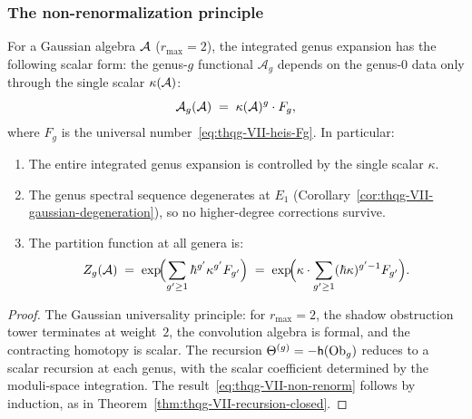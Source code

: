 \subsubsection{The non-renormalization principle}
\label{subsubsec:thqg-VII-non-renormalization}

\begin{theorem}
\label{thm:thqg-VII-non-renormalization}
For a Gaussian algebra $\mathcal{A}$ \textup{(}$r_{\max} = 2$\textup{)},
the integrated genus expansion has the following scalar
form: the genus-$g$ functional
$\mathcal{A}_g$ depends on the genus-$0$ data only through
the single scalar $\kappa(\mathcal{A})$:
\begin{equation}\label{eq:thqg-VII-non-renorm}
\mathcal{A}_g(\mathcal{A})
\;=\;
\kappa(\mathcal{A})^g \cdot F_g,
\end{equation}
where $F_g$ is the universal number~\eqref{eq:thqg-VII-heis-Fg}.
In particular:
\begin{enumerate}[label=\textup{(\roman*)}]
\item The entire integrated genus expansion is controlled by the
 single scalar $\kappa$.
\item The genus spectral sequence degenerates at $E_1$
 \textup{(}Corollary~\textup{\ref{cor:thqg-VII-gaussian-degeneration})},
 so no higher-degree corrections survive.
\item The partition function at all genera is:
 \begin{equation}\label{eq:thqg-VII-non-renorm-Z}
 Z_g(\mathcal{A})
 \;=\;
 \exp\!\Bigl(\sum_{g' \geq 1} \hbar^{g'}
 \kappa^{g'} F_{g'}\Bigr)
 \;=\;
 \exp\!\Bigl(\kappa \cdot
 \sum_{g' \geq 1} (\hbar\kappa)^{g'-1} F_{g'}\Bigr).
 \end{equation}
\end{enumerate}
\end{theorem}

\begin{proof}
The Gaussian universality principle: for $r_{\max} = 2$, the
shadow obstruction tower terminates at weight~$2$, the convolution algebra
is formal, and the contracting homotopy is scalar. The
recursion $\Theta^{(g)} = -\mathsf{h}(\mathrm{Ob}_g)$ reduces to a scalar
recursion at each genus, with the scalar coefficient
determined by the moduli-space integration. The
result~\eqref{eq:thqg-VII-non-renorm} follows by induction,
as in Theorem~\ref{thm:thqg-VII-recursion-closed}.
\end{proof}


